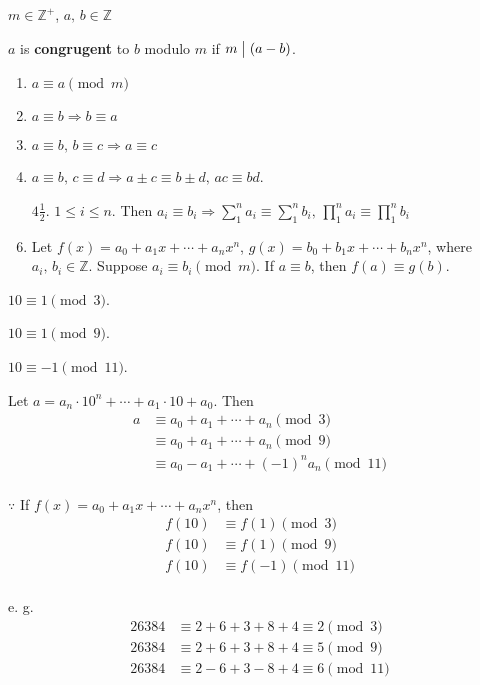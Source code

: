 
\begin{definition}
    $m \in \mathbb{Z}^+$, $a,\,b \in \mathbb{Z}$

    $a$ is \textbf{congrugent} to $b$ modulo $m$ if $m \bigm| \left(a-b\right)$.
\end{definition}

\begin{theorem}
    \begin{enumerate}
        \item $a \equiv a\pmod{m}$
        \item $a \equiv b \Rightarrow b \equiv a$
        \item $a \equiv b,\, b \equiv c \Rightarrow a \equiv c$
        \item $a \equiv b,\, c \equiv d \Rightarrow a \pm c \equiv b \pm d,\, ac \equiv bd$.
        \item[$\mathit{4\frac{1}{2}}$.] $1 \leq i \leq n$. Then
        $a_i \equiv b_i \Rightarrow \sum_1^n a_i \equiv \sum_1^n b_i,\, \prod_1^n a_i \equiv \prod_1^n b_i$ 
        \item Let $f\left(x\right) = a_0 + a_1x + \cdots + a_nx^n$, $g\left(x\right) = b_0 + b_1x + \cdots + b_nx^n$,
        where $a_i,\,b_i \in \mathbb{Z}$. Suppose $a_i \equiv b_i\pmod{m}$. If $a \equiv b$, then $f\left(a\right) \equiv g\left(b\right)$.
    \end{enumerate}
\end{theorem}

\begin{example}
    $10 \equiv 1\pmod{3}$.

    $10 \equiv 1\pmod{9}$.
    
    $10 \equiv -1\pmod{11}$.

    Let $a=a_n \cdot 10^n+\cdots+a_1 \cdot 10+a_0$. Then
    \begin{align*}
        a &\equiv a_0 + a_1 + \cdots + a_n \pmod{3} \\
        &\equiv a_0 + a_1 + \cdots + a_n \pmod{9} \\
        &\equiv a_0 - a_1 + \cdots + \left(-1\right)^n a_n \pmod{11} \\
    \end{align*}

    $\because$ If $f\left(x\right)=a_0+a_1x+\cdots+a_nx^n$, then
    \begin{align*}
        f\left(10\right) &\equiv f\left(1\right) \pmod{3} \\
        f\left(10\right) &\equiv f\left(1\right) \pmod{9} \\
        f\left(10\right) &\equiv f\left(-1\right) \pmod{11} \\
    \end{align*}

    e. g. 
    \begin{align*}
        26384 &\equiv 2+6+3+8+4 \equiv 2 \pmod{3} \\
        26384 &\equiv 2+6+3+8+4 \equiv 5 \pmod{9} \\
        26384 &\equiv 2-6+3-8+4 \equiv 6 \pmod{11} \\
    \end{align*}
\end{example}


